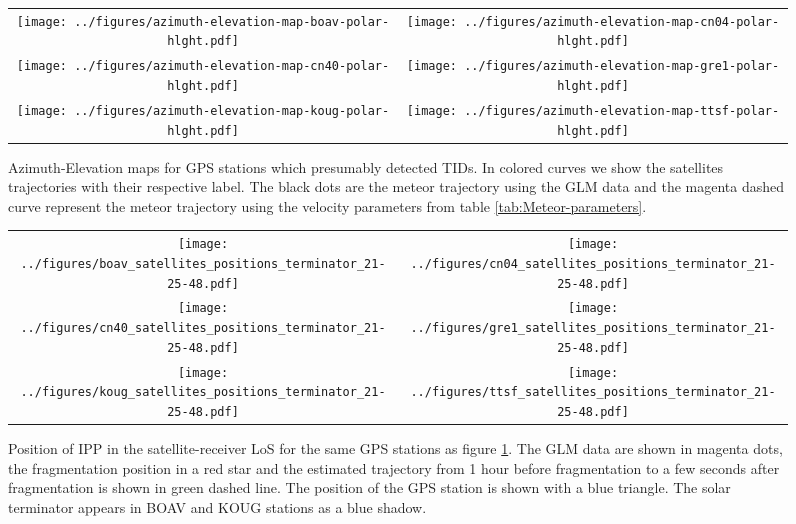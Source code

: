 \begin{figure*}
    \begin{tabular}{cc}
      \texttt{[image: ../figures/azimuth-elevation-map-boav-polar-hlght.pdf]}   & \texttt{[image: ../figures/azimuth-elevation-map-cn04-polar-hlght.pdf]} \\
            \texttt{[image: ../figures/azimuth-elevation-map-cn40-polar-hlght.pdf]}   & \texttt{[image: ../figures/azimuth-elevation-map-gre1-polar-hlght.pdf]} \\
     \texttt{[image: ../figures/azimuth-elevation-map-koug-polar-hlght.pdf]}   & \texttt{[image: ../figures/azimuth-elevation-map-ttsf-polar-hlght.pdf]} \\
    \end{tabular}
    \label{fig:azimuth-elevations-maps-1}
    \caption{Azimuth-Elevation maps for GPS stations which presumably detected TIDs. In colored curves we show the satellites trajectories with their respective label. The black dots are the meteor trajectory using the GLM data and the magenta dashed curve represent the meteor trajectory using the velocity parameters from table \ref{tab:Meteor-parameters}.}
\end{figure*}

\begin{figure*}
    \centering
    \begin{tabular}{cc}
    \texttt{[image: ../figures/boav\_satellites\_positions\_terminator\_21-25-48.pdf]} & \texttt{[image: ../figures/cn04\_satellites\_positions\_terminator\_21-25-48.pdf]}\\
    \texttt{[image: ../figures/cn40\_satellites\_positions\_terminator\_21-25-48.pdf]} & \texttt{[image: ../figures/gre1\_satellites\_positions\_terminator\_21-25-48.pdf]} \\
    \texttt{[image: ../figures/koug\_satellites\_positions\_terminator\_21-25-48.pdf]} & \texttt{[image: ../figures/ttsf\_satellites\_positions\_terminator\_21-25-48.pdf]}
    \end{tabular}
    \caption{Position of IPP in the satellite-receiver LoS for the same GPS stations as figure \ref{fig:azimuth-elevations-maps-1}. The GLM data are shown in magenta dots, the fragmentation position in a red star and the estimated trajectory from 1 hour before fragmentation to a few seconds after fragmentation is shown in green dashed line. The position of the GPS station is shown with a blue triangle. The solar terminator appears in BOAV and KOUG stations as a blue shadow.}
    \label{fig:satellites-and-terminator}
\end{figure*}



